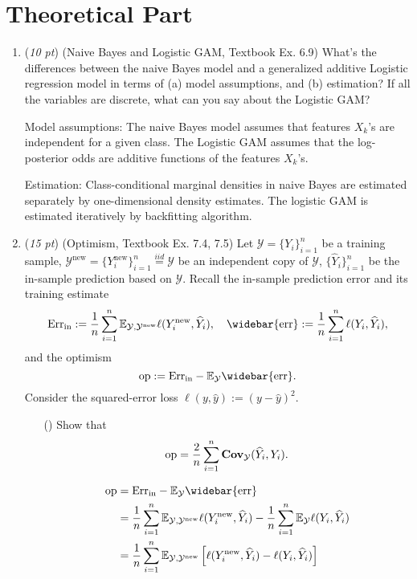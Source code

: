 \documentclass[10pt]{article}
\theoremstyle{definition}
\theoremstyle{remark}
\newcommand{\bbE}{\mathbb{E}}
\newcommand{\cY}{\mathcal{Y}}
\newcommand{\bCov}{\mathbf{Cov}}	%
\newcommand{\err}{\mathrm{err}}		%
\newcommand{\Err}{\mathrm{Err}}		%
\newcommand{\rin}{\mathrm{in}}		%
\newcommand{\new}{\mathrm{new}}		%
\newcommand{\op}{\mathrm{op}}		%
\begin{document}
\section*{Theoretical Part}
\begin{enumerate}
	\item (\textit{10 pt}) (Naive Bayes and Logistic GAM, Textbook Ex. 6.9) What's the differences between the naive Bayes model and a generalized additive Logistic regression model in terms of (a) model assumptions, and (b) estimation? If all the variables are discrete, what can you say about the Logistic GAM?
	
	Model assumptions: The naive Bayes model assumes that features $X_k$'s are independent for a given class. The Logistic GAM assumes that the log-posterior odds are additive functions of the features $X_k$'s.
	
	Estimation: Class-conditional marginal densities in naive Bayes are estimated separately by one-dimensional density estimates. The logistic GAM is estimated iteratively by backfitting algorithm.
	
	\item (\textit{15 pt}) (Optimism, Textbook Ex. 7.4, 7.5) Let $ \cY=\{ Y_{i} \}_{i=1}^{n}$ be a training sample, $ \cY^{\new}=\{Y_{i}^{\new}\}_{i=1}^{n} \overset{iid}{=} \cY $ be an independent copy of $ \cY $, $ \{ \widehat{Y}_{i} \}_{i=1}^{n} $ be the in-sample prediction based on $ \cY $. Recall the in-sample prediction error and its training estimate
	\[ \Err_{\rin} := {1 \over n}\sum_{i=1}^{n}\bbE_{\cY,\cY^{\new}}\ell(Y_{i}^{\new},\widehat{Y}_{i}), \quad \widebar{\err} := {1 \over n}\sum_{i=1}^{n}\ell(Y_{i},\widehat{Y}_{i}), \]
	and the optimism
	\[ \op := \Err_{\rin} - \bbE_{\cY} \widebar{\err}. \]
	Consider the squared-error loss $ \ell(y,\widehat{y}) := (y - \widehat{y})^{2} $. 
	\begin{itemize}
		\item [(\Romannum{1})] Show that
		\[ \op = {2 \over n}\sum_{i=1}^{n}\bCov_{\cY}( \widehat{Y}_{i},Y_{i} ). \]
		
		\begin{align*}
		    \op & = \Err_{\rin} - \bbE_{\cY} \widebar{\err} \\
		    & = {1 \over n}\sum_{i=1}^{n}\bbE_{\cY,\cY^{\new}}\ell(Y_{i}^{\new},\widehat{Y}_{i}) - {1 \over n}\sum_{i=1}^{n} \bbE_{\cY} \ell(Y_{i},\widehat{Y}_{i}) \\
		    & = {1 \over n}\sum_{i=1}^{n}\bbE_{\cY,\cY^{\new}}\left[ \ell(Y_{i}^{\new},\widehat{Y}_{i}) - \ell(Y_{i},\widehat{Y}_{i}) \right]
		\end{align*}
		

\end{itemize}
\end{enumerate}
\end{document}
